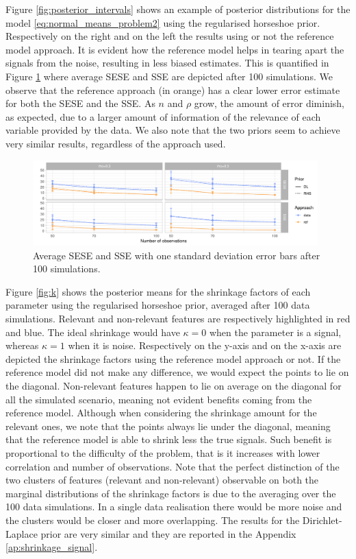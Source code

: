 \documentclass[american,]{article}
\theoremstyle{definition}
\begin{document}
Figure \ref{fig:posterior_intervals} shows an example of posterior distributions for the model \eqref{eq:normal_means_problem2} using the regularised horseshoe prior. Respectively on the right and on the left the results using or not the reference model approach. It is evident how the reference model helps in tearing apart the signals from the noise, resulting in less biased estimates. This is quantified in Figure \ref{fig:SESE_SSE} where average SESE and SSE are depicted after 100 simulations. We observe that the reference approach (in orange) has a clear lower error estimate for both the SESE and the SSE. As $n$ and $\rho$ grow, the amount of error diminish, as expected, due to a larger amount of information of the relevance of each variable provided by the data. We also note that the two priors seem to achieve very similar results, regardless of the approach used.

\begin{figure}[tp]
  \centering
  \includegraphics[width=0.98\textwidth]{graphics/SESE_SSE.pdf}
  \caption{Average SESE and SSE with one standard deviation error bars after 100 simulations.\\}
  \label{fig:SESE_SSE}
\end{figure}

Figure \ref{fig:k} shows the posterior means for the shrinkage factors of each parameter using the regularised horseshoe prior, averaged after 100 data simulations. Relevant and non-relevant features are respectively highlighted in red and blue. The ideal shrinkage would have $\kappa=0$ when the parameter is a signal, whereas $\kappa=1$ when it is noise. Respectively on the y-axis and on the x-axis are depicted the shrinkage factors using the reference model approach or not. If the reference model did not make any difference, we would expect the points to lie on the diagonal. Non-relevant features happen to lie on average on the diagonal for all the simulated scenario, meaning not evident benefits coming from the reference model. Although when considering the shrinkage amount for the relevant ones, we note that the points always lie under the diagonal, meaning that the reference model is able to shrink less the true signals. Such benefit is proportional to the difficulty of the problem, that is it increases with lower correlation and number of observations. Note that the perfect distinction of the two clusters of features (relevant and non-relevant) observable on both the marginal distributions of the shrinkage factors is due to the averaging over the 100 data simulations. In a single data realisation there would be more noise and the clusters would be closer and more overlapping.
The results for the Dirichlet-Laplace prior are very similar and they are reported in the Appendix \ref{ap:shrinkage_signal}.
\end{document}
